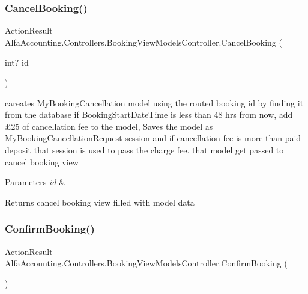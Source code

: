 \subsubsection{\texorpdfstring{Cancel\+Booking()}{CancelBooking()}}
{\footnotesize\ttfamily Action\+Result Alfa\+Accounting.\+Controllers.\+Booking\+View\+Models\+Controller.\+Cancel\+Booking (\begin{DoxyParamCaption}\item[{int?}]{id }\end{DoxyParamCaption})}



careates My\+Booking\+Cancellation model using the routed booking id by finding it from the database if Booking\+Start\+Date\+Time is less than 48 hrs from now, add £25 of cancellation fee to the model, Saves the model as My\+Booking\+Cancellation\+Request session and if cancellation fee is more than paid deposit that session is used to pass the charge fee. that model get passed to cancel booking view 


\begin{DoxyParams}{Parameters}
{\em id} & \\
\hline
\end{DoxyParams}
\begin{DoxyReturn}{Returns}
cancel booking view filled with model data
\end{DoxyReturn}
\mbox{\label{class_alfa_accounting_1_1_controllers_1_1_booking_view_models_controller_a27f68c32481b86742af2ecc237d8ec65}} 
\subsubsection{\texorpdfstring{Confirm\+Booking()}{ConfirmBooking()}}
{\footnotesize\ttfamily Action\+Result Alfa\+Accounting.\+Controllers.\+Booking\+View\+Models\+Controller.\+Confirm\+Booking (\begin{DoxyParamCaption}{ }\end{DoxyParamCaption})}



